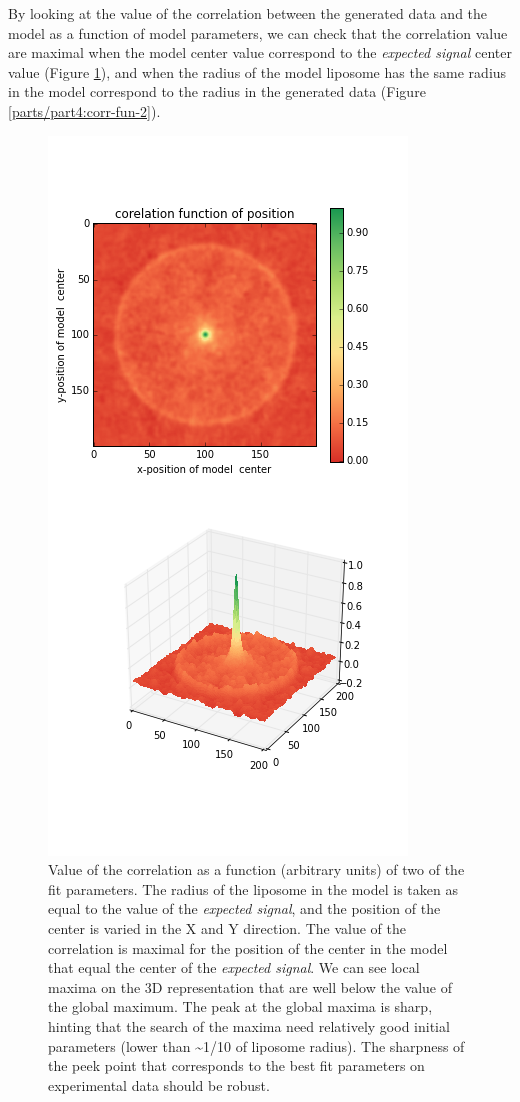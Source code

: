 \documentclass[A4paperpaper,11pt,english]{sphinxmanual}
\begin{document}
By looking at the value of the correlation between the generated data and the model
as a function of model parameters, we can check that the correlation
value are maximal when the model center value correspond to the \emph{expected signal}
center value (Figure \ref{parts/part4:corr-fun-1}), and when the radius of the model liposome
has the same radius in the model correspond to the radius in the generated data (Figure \ref{parts/part4:corr-fun-2}).
\begin{figure}[htbp]
\centering
\capstart

\includegraphics[width=0.500\linewidth]{double-c-_100-by-100-rc-40_0-noise-0_5-delta-4_0_.png}
\caption{Value of the correlation as a function (arbitrary units) of two of the fit
parameters. The radius of the liposome in the model is taken as
equal to the value of the \emph{expected signal}, and the position of the center is
varied in the X and Y direction. The value of the correlation is maximal for
the position of the center in the model that equal the center of the \emph{expected signal}.  We
can see local maxima on the 3D representation that are well below the value
of the global maximum. The peak at the global maxima is sharp, hinting that
the search of the maxima need relatively good initial
parameters (lower than \textasciitilde{}1/10 of liposome radius). The sharpness of the peek
point that corresponds to the best fit parameters on experimental data should be
robust.}\label{parts/part4:corr-fun-1}\end{figure}
\end{document}
